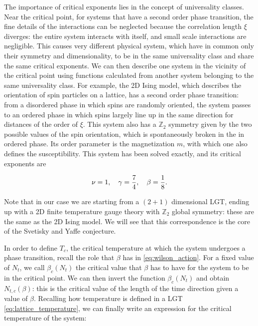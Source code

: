 \documentclass[reqno,12pt]{article}
\numberwithin{equation}{section}
\begin{document}
The importance of critical exponents lies in the concept of universality classes. Near the critical point, for systems
that have a second order phase transition, the fine details of the interactions can be neglected because the correlation
length $\xi$ diverges: the entire system interacts with itself, and small scale interactions are negligible. This causes
very different physical system, which have in common only their symmetry and dimensionality, to be in the same universality 
class and share the same critical exponents. We can then describe one system in the vicinity of the critical point using
functions calculated from another system belonging to the same universality class. For example, the 2D Ising model, which
describes the orientation of spin particles on a lattice, has a second order phase transition: from a disordered phase in
which spins are randomly oriented, the system passes to an ordered phase in which spins largely
line up in the same direction for distances of the order of $\xi$. This system also has a $\mathbb{Z}_2$ symmetry
given by the two possible values of the spin orientation, which is spontaneously broken in the in ordered phase. 
Its order parameter is the magnetization $m$, with which one also defines the susceptibility. This system has been
solved exactly, and its critical exponents are 

\begin{equation} \label{eq:critical_exponents}
	\nu = 1 \qc \gamma = \frac{7}{4} \qc \beta = \frac{1}{8}. 
\end{equation}

Note that in our case we are starting from a $(2+1)$ dimensional LGT, ending up with a 2D finite temperature gauge theory
with $\mathbb{Z}_2$ global symmetry: these are the same as the 2D Ising model. We will see that this correspondence 
is the core of the Svetisky and Yaffe conjecture.    

In order to define $T_c$, the critical temperature at which the system undergoes a phase transition, recall
the role that $\beta$ has in \eqref{eq:wilson_action}. For a fixed value of $N_t$, we call $\beta_c(N_t)$ the critical value
that $\beta$ has to have for the system to be in the critical point. We can then invert the function $\beta_c(N_t)$
and obtain $N_{t,c}(\beta)$: this is the critical value of the length of the time direction given a value of $\beta$.
Recalling how temperature is defined in a LGT \eqref{eq:lattice_temperature}, we can finally write an expression
for the critical temperature of the system:
\end{document}
